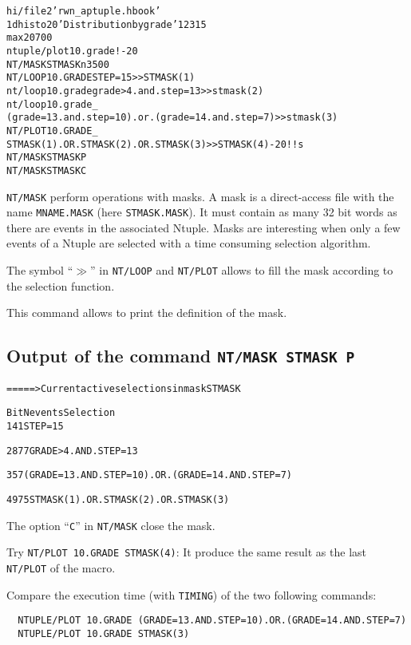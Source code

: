 \begin{alltt}
      hi/file 2 'rwn_aptuple.hbook'
      1dhisto 20 'Distribution by grade' 12 3 15
      max 20 700
      ntuple/plot 10.grade ! -20
     NT/MASK STMASK n 3500
     NT/LOOP 10.GRADE STEP=15>>STMASK(1)
      nt/loop 10.grade grade>4.and.step=13>>stmask(2)
      nt/loop 10.grade _
      (grade=13.and.step=10).or.(grade=14.and.step=7)>>stmask(3)
      NT/PLOT 10.GRADE _
      STMASK(1).OR.STMASK(2).OR.STMASK(3)>>STMASK(4) -20 ! ! s
     NT/MASK STMASK P
     NT/MASK STMASK C
\end{alltt} 
\begin{DinglistE}
\item {\tt NT/MASK} perform operations with masks. A mask is a
      direct-access file with the name {\tt MNAME.MASK}
      (here {\tt STMASK.MASK}). It must contain as many 32 bit words as there
      are events in the associated Ntuple. Masks
      are interesting when only a few events of a Ntuple are selected with a
      time consuming selection algorithm.
\item The symbol ``$\gg$'' in {\tt NT/LOOP} and {\tt NT/PLOT} allows
      to fill the mask according to the selection function.
\item This command allows to print the definition of the mask.
\subsection*{Output of the command {\tt NT/MASK STMASK P}}
\begin{alltt}

 =====> Current active selections in mask STMASK

 Bit  Nevents    Selection
   1      41     STEP=15

   2     877     GRADE>4.AND.STEP=13

   3      57     (GRADE=13.AND.STEP=10).OR.(GRADE=14.AND.STEP=7)

   4     975     STMASK(1).OR.STMASK(2).OR.STMASK(3)

\end{alltt} 
\item The option ``{\tt C}'' in {\tt NT/MASK} close the mask.
\item Try {\tt NT/PLOT 10.GRADE STMASK(4)}: It produce the same result as the
      last {\tt NT/PLOT} of the macro.
\item Compare the execution time (with {\tt TIMING}) of the two following
      commands:
\begin{verbatim}
  NTUPLE/PLOT 10.GRADE (GRADE=13.AND.STEP=10).OR.(GRADE=14.AND.STEP=7)
  NTUPLE/PLOT 10.GRADE STMASK(3)
\end{verbatim}
\end{DinglistE}

